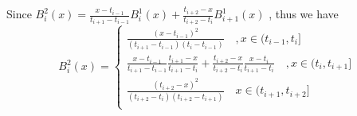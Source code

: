 \documentclass{article}
\begin{document}
Since $B^{2}_{i}(x)=\frac{x-t_{i-1}}{t_{i+1}-t_{i-1}}B^{1}_{i}(x)
+\frac{t_{i+2}-x}{t_{i+2}-t_{i}}B^{1}_{i+1}(x)$ , thus we have
\begin{equation*}
    B^{2}_{i}(x)=
    \begin{cases}
        \frac{(x-t_{i-1})^2}{(t_{i+1}-t_{i-1})(t_i-t_{i-1})}\quad ,x\in(t_{i-1},t_i] \\
        \frac{x-t_{i-1}}{t_{i+1}-t_{i-1}}\frac{t_{i+1}-x}{t_{i+1}-t_i}
			+\frac{t_{i+2}-x}{t_{i+2}-t_{i}}\frac{x-t_{i}}{t_{i+1}-t_{i}}\quad ,x\in(t_i,t_{i+1}]\\
        \frac{(t_{i+2}-x)^2}{(t_{i+2}-t_{i})(t_{i+2}-t_{i+1})}\quad x\in(t_{i+1},t_{i+2}]\\ 
    \end{cases}
\end{equation*}
\end{document}
